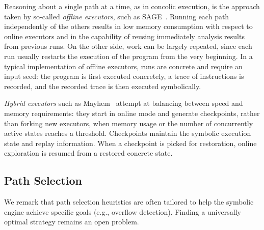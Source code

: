 Reasoning about a single path at a time, as in concolic execution, is the approach taken by so-called {\em offline executors}, such as {\sc SAGE}~\cite{SAGE-NDSS08}. Running each path independently of the others results in low memory consumption with respect to online executors and in the capability of reusing immediately analysis results from previous runs. On the other side, work can be largely repeated, since each run usually restarts the execution of the program from the very beginning. In a typical implementation of offline executors, runs are concrete and require an input seed: the program is first executed concretely, a trace of instructions is recorded, and the recorded trace is then executed symbolically.

{\em Hybrid executors} such as {\sc Mayhem}~\cite{MAYHEM-SP12} attempt at balancing between speed and memory requirements: they start in online mode and generate checkpoints, rather than forking new executors, when memory usage or the number of concurrently active states reaches a threshold. Checkpoints maintain the symbolic execution state and replay information. When a checkpoint is picked for restoration, online exploration is resumed from a restored concrete state.

\subsection{Path Selection}
\label{ss:heuristics}

%
We remark that path selection heuristics are often tailored to help the symbolic engine achieve specific goals (e.g., overflow detection). Finding a universally   optimal strategy remains an open problem. %

